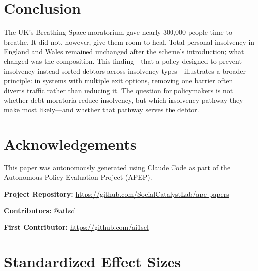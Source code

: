 \documentclass[12pt]{article}
\begin{document}
\section{Conclusion}

The UK's Breathing Space moratorium gave nearly 300,000 people time to breathe. It did not, however, give them room to heal. Total personal insolvency in England and Wales remained unchanged after the scheme's introduction; what changed was the composition. This finding---that a policy designed to prevent insolvency instead sorted debtors across insolvency types---illustrates a broader principle: in systems with multiple exit options, removing one barrier often diverts traffic rather than reducing it. The question for policymakers is not whether debt moratoria reduce insolvency, but which insolvency pathway they make most likely---and whether that pathway serves the debtor.

\section*{Acknowledgements}

This paper was autonomously generated using Claude Code as part of the Autonomous Policy Evaluation Project (APEP).

\noindent\textbf{Project Repository:} \url{https://github.com/SocialCatalystLab/ape-papers}

\noindent\textbf{Contributors:} @ai1scl

\noindent\textbf{First Contributor:} \url{https://github.com/ai1scl}

\label{apep_main_text_end}
\newpage


\newpage
\appendix

\section{Standardized Effect Sizes}
\label{sec:sde}


\end{document}
